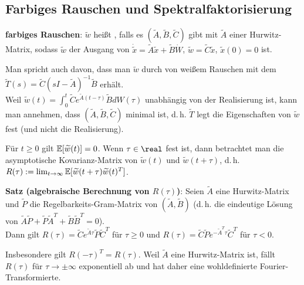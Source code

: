 \pagebreak

\subsection{%
    Farbiges Rauschen und Spektralfaktorisierung%
}

\textbf{farbiges Rauschen}:
$\widetilde{w}$ heißt , falls es
$(\widetilde{A}, \widetilde{B}, \widetilde{C})$ gibt
mit $\widetilde{A}$ einer Hurwitz-Matrix, sodass
$\widetilde{w}$ der Ausgang von
$\dot{\widetilde{x}} = \widetilde{A} \widetilde{x} + \widetilde{B} \dot{W}$,
$\widetilde{w} = \widetilde{C} \widetilde{x}$, $\widetilde{x}(0) = 0$ ist.

Man spricht auch davon, dass man $\widetilde{w}$ durch
 von weißem Rauschen mit dem 
$\widetilde{T}(s) = \widetilde{C} (sI - \widetilde{A})^{-1} \widetilde{B}$ erhält.\\
Weil $\widetilde{w}(t) = \int_0^t \widetilde{C} e^{\widetilde{A}(t - \tau)} \widetilde{B} dW(\tau)$
unabhängig von der Realisierung ist, kann man annehmen, dass
$(\widetilde{A}, \widetilde{B}, \widetilde{C})$ minimal ist,
d.\,h. $\widetilde{T}$ legt die Eigenschaften von $\widetilde{w}$ fest
(und nicht die Realisierung).

\linie

Für $t \ge 0$ gilt $\mathbb{E}[\widetilde{w}(t)] = 0$.
Wenn $\tau \in \real$ fest ist, dann betrachtet man die asymptotische Kovarianz-Matrix von
$\widetilde{w}(t)$ und $\widetilde{w}(t + \tau)$, d.\,h.
$R(\tau) := \lim_{t \to \infty} \mathbb{E}[\widetilde{w}(t + \tau) \widetilde{w}(t)^T]$.

\textbf{Satz (algebraische Berechnung von $R(\tau)$)}:
Seien $\widetilde{A}$ eine Hurwitz-Matrix und $\widetilde{P}$ die Regelbarkeits-Gram-Matrix
von $(\widetilde{A}, \widetilde{B})$
(d.\,h. die eindeutige Lösung von
$\widetilde{A} \widetilde{P} +
\widetilde{P} \widetilde{A}^T + \widetilde{B} \widetilde{B}^T = 0$).\\
Dann gilt
$R(\tau) = \widetilde{C} e^{\widetilde{A}\tau} \widetilde{P} \widetilde{C}^T$ für $\tau \ge 0$ und
$R(\tau) = \widetilde{C} \widetilde{P} e^{-\widetilde{A}^T\tau} \widetilde{C}^T$ für $\tau < 0$.

Insbesondere gilt $R(-\tau)^T = R(\tau)$.
Weil $\widetilde{A}$ eine Hurwitz-Matrix ist, fällt $R(\tau)$ für $\tau \rightarrow \pm\infty$
exponentiell ab und hat daher eine wohldefinierte Fourier-Transformierte.

